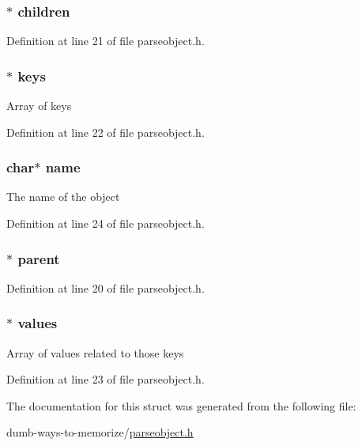 \subsubsection[{\texorpdfstring{children}{children}}]{$\ast$ children}\hypertarget{structobject__s_a2746ae4a23a7e9cd4c7d266d32c3f30f}{}\label{structobject__s_a2746ae4a23a7e9cd4c7d266d32c3f30f}


Definition at line 21 of file parseobject.\+h.

\subsubsection[{\texorpdfstring{keys}{keys}}]{$\ast$ keys}\hypertarget{structobject__s_a720905251b014f5c9ec82e66e8463f4e}{}\label{structobject__s_a720905251b014f5c9ec82e66e8463f4e}
Array of keys 

Definition at line 22 of file parseobject.\+h.

\subsubsection[{\texorpdfstring{name}{name}}]{\setlength{\rightskip}{0pt plus 5cm}char$\ast$ name}\hypertarget{structobject__s_a5ac083a645d964373f022d03df4849c8}{}\label{structobject__s_a5ac083a645d964373f022d03df4849c8}
The name of the object 

Definition at line 24 of file parseobject.\+h.

\subsubsection[{\texorpdfstring{parent}{parent}}]{$\ast$ parent}\hypertarget{structobject__s_a444f5b5cbba653b103c8841fa8536b8d}{}\label{structobject__s_a444f5b5cbba653b103c8841fa8536b8d}


Definition at line 20 of file parseobject.\+h.

\subsubsection[{\texorpdfstring{values}{values}}]{$\ast$ values}\hypertarget{structobject__s_ab74cb2267ebadadd15e6bb59e85cc3f9}{}\label{structobject__s_ab74cb2267ebadadd15e6bb59e85cc3f9}
Array of values related to those keys 

Definition at line 23 of file parseobject.\+h.



The documentation for this struct was generated from the following file\+:\begin{DoxyCompactItemize}
\item 
dumb-\/ways-\/to-\/memorize/\hyperlink{parseobject_8h}{parseobject.\+h}\end{DoxyCompactItemize}
